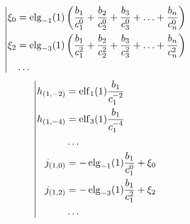 \begin{equation*} \left| \begin{aligned}
\xi_0 &= \elg_{-1}(1) \left(
  \frac{b_1}{c_1^0}
+ \frac{b_2}{c_2^0}
+ \frac{b_3}{c_3^0}
+ \ldots
+ \frac{b_n}{c_n^0} \right) \\
%
\xi_2 &= \elg_{-3}(1) \left(
  \frac{b_1}{c_1^2}
+ \frac{b_2}{c_2^2}
+ \frac{b_3}{c_3^2}
+ \ldots
+ \frac{b_n}{c_n^2} \right) \\
%
&\ldots \\
\end{aligned} \right. \end{equation*}
%
\begin{equation*} \left| \begin{aligned}
%
h_{(1,-2)} &=
  \elf_1(1) \frac{b_1}{c_1^{-2}} \\
%
h_{(1,-4)} &=
  \elf_3(1) \frac{b_1}{c_1^{-4}} \\
%
&\ldots \\
%
j_{(1,0)} &=
- \elg_{-1}(1) \frac{b_1}{c_1^0}
+ \xi_0 \\
%
j_{(1,2)} &=
- \elg_{-3}(1) \frac{b_1}{c_1^2}
+ \xi_2 \\
%
&\ldots \\
\end{aligned} \right. \end{equation*}

